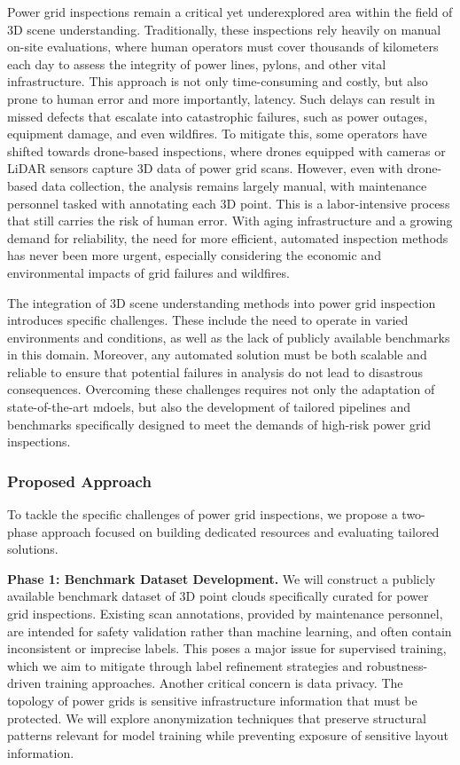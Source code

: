 Power grid inspections remain a critical yet underexplored area within the
field of 3D scene understanding.
%
Traditionally, these inspections rely heavily on manual on-site evaluations,
where human operators must cover thousands of kilometers each day to assess the
integrity of power lines, pylons, and other vital infrastructure.
%
This approach is not only time-consuming and costly, but also prone to human
error and more importantly, latency. Such delays can result in missed defects
that escalate into catastrophic failures, such as power outages, equipment
damage, and even wildfires.
%
To mitigate this, some operators have shifted towards drone-based inspections,
where drones equipped with cameras or LiDAR sensors capture 3D data of power
grid scans.
%
However, even with drone-based data collection, the analysis remains largely
manual, with maintenance personnel tasked with annotating each 3D point. This
is a labor-intensive process that still carries the risk of human error. With
aging infrastructure and a growing demand for reliability, the need for more
efficient, automated inspection methods has never been more urgent, especially
considering the economic and environmental impacts of grid failures and
wildfires.

%
The integration of 3D scene understanding methods into power grid inspection
introduces specific challenges. These include the need to operate in varied
environments and conditions, as well as the lack of publicly available
benchmarks in this domain.
%
Moreover, any automated solution must be both scalable and reliable to ensure
that potential failures in analysis do not lead to disastrous consequences.
%
Overcoming these challenges requires not only the adaptation of
state-of-the-art mdoels, but also the development of tailored pipelines and
benchmarks specifically designed to meet the demands of high-risk power grid
inspections.

\subsubsection{Proposed Approach}
%
%
To tackle the specific challenges of power grid inspections, we propose a
two-phase approach focused on building dedicated resources and evaluating
tailored solutions.

\textbf{Phase 1: Benchmark Dataset Development.}
We will construct a publicly available
benchmark dataset of 3D point clouds specifically curated for power grid
inspections. Existing scan annotations, provided by maintenance personnel, are
intended for safety validation rather than machine learning, and often contain
inconsistent or imprecise labels. This poses a major issue for supervised
training, which we aim to mitigate through label refinement strategies and
robustness-driven training approaches.
%
Another critical concern is data privacy. The topology of power grids is
sensitive infrastructure information that must be protected. We will explore
anonymization techniques that preserve structural patterns relevant for model
training while preventing exposure of sensitive layout information.

